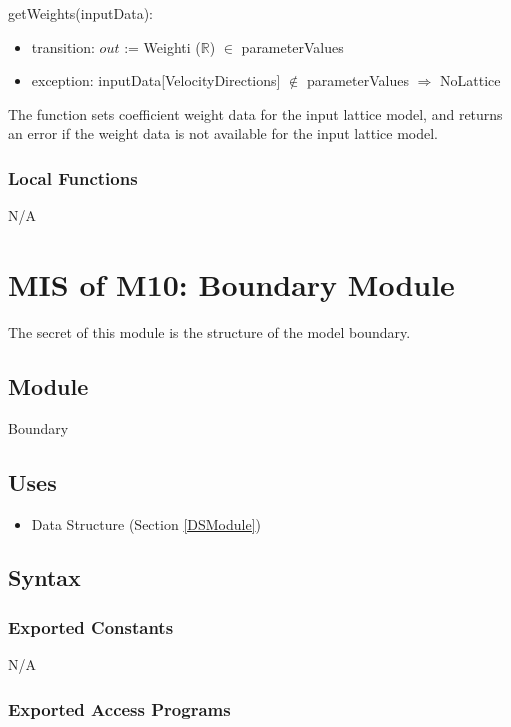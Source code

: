 \documentclass[12pt, titlepage]{article}
\begin{document}
\noindent getWeights(inputData):
\begin{itemize}
	\item transition: $out$ := Weighti ($\mathbb{R}$) $\in$ parameterValues
	\item exception: inputData[VelocityDirections] $\notin$ parameterValues $\Rightarrow$ NoLattice
\end{itemize}

The function sets coefficient weight data for the input lattice model, and returns an error if the weight data is not available for the input lattice model.

\subsubsection{Local Functions}
N/A

\newpage

\section{MIS of M10: Boundary Module} \label{BOModule}

The secret of this module is the structure of the model boundary.

\subsection{Module}

Boundary

\subsection{Uses}
\begin{itemize}
	\item Data Structure (Section \ref{DSModule})
\end{itemize}

\subsection{Syntax}

\subsubsection{Exported Constants}
N/A
\subsubsection{Exported Access Programs}
\end{document}
